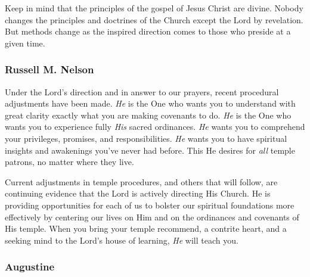		\begin{compactdesc}
			\item[{\href{https://www.churchofjesuschrist.org/study/ensign/1971/01/gods-kingdom-a-kingdom-of-order?lang=eng}{January 1971}}] Keep in mind that the principles of the gospel of Jesus Christ are divine. Nobody changes the principles and doctrines of the Church except the Lord by revelation. But methods change as the inspired direction comes to those who preside at a given time.
		\end{compactdesc}
		
	\subsubsection{Russell M. Nelson} %
		\label{EPIST-REVELATION-NELSON}
	
		\begin{compactdesc}
			\item[{\href{https://www.churchofjesuschrist.org/study/general-conference/2021/10/47nelson?lang=eng}{October 2021}}] Under the Lord's direction and in answer to our prayers, recent procedural adjustments have been made. \textit{He} is the One who wants you to understand with great clarity exactly what you are making covenants to do. \textit{He} is the One who wants you to experience fully \textit{His} sacred ordinances. \textit{He} wants you to comprehend your privileges, promises, and responsibilities. \textit{He} wants you to have spiritual insights and awakenings you've never had before. This He desires for \textit{all} temple patrons, no matter where they live.
			
			Current adjustments in temple procedures, and others that will follow, are continuing evidence that the Lord is actively directing His Church. He is providing opportunities for each of us to bolster our spiritual foundations more effectively by centering our lives on Him and on the ordinances and covenants of His temple. When you bring your temple recommend, a contrite heart, and a seeking mind to the Lord's house of learning, \textit{He} will teach you.
		\end{compactdesc}
		
	\subsubsection{Augustine}
		\label{EPIST-REVELATION-AUGUSTINE}
		

